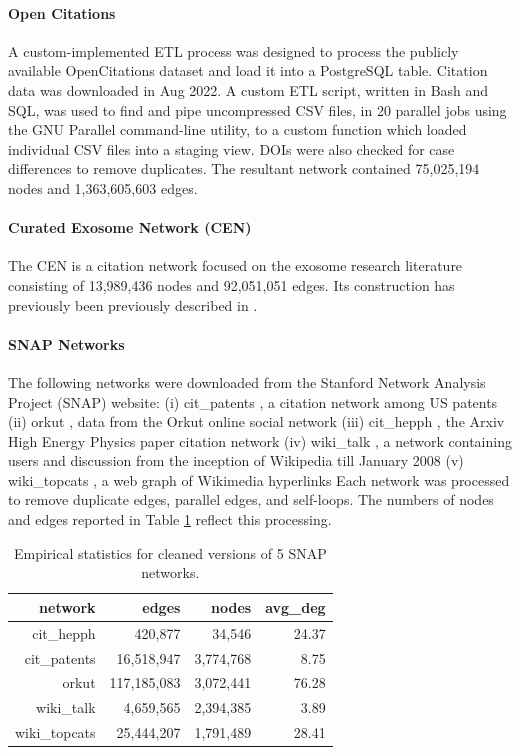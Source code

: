 \documentclass[11pt]{article}   	%
\begin{document}
\paragraph{Open Citations}
A custom-implemented ETL process was designed to process the publicly available OpenCitations dataset \citep{Peroni2020} and load it into a PostgreSQL table. Citation data was downloaded in Aug 2022. A custom ETL script, written in Bash and SQL, was used to find and pipe uncompressed CSV files, in 20 parallel jobs using the GNU Parallel command-line utility, to a custom function which loaded individual CSV files into a staging view. DOIs were also checked for case differences to remove duplicates.  The resultant network contained 75,025,194 nodes and 1,363,605,603 edges.  


\paragraph{Curated Exosome Network (CEN)}
The CEN is a citation network focused on the exosome research literature consisting of 13,989,436 nodes and 92,051,051 edges. Its construction has previously been previously described in \cite{Jakatdar_2022}.


\paragraph{SNAP Networks}The following networks were downloaded from the Stanford Network Analysis Project (SNAP) website: (i) cit\_patents \citep{Leskovec2005}, a citation network among US patents (ii) orkut \citep{Yang2013}, data from the Orkut online social network (iii) cit\_hepph \citep{Leskovec2005}, the Arxiv High Energy Physics paper citation network  (iv) wiki\_talk \citep{Leskovec2010}, a network containing users and discussion from the inception of Wikipedia till January 2008 (v) wiki\_topcats \citep{Yin2017}, a web graph of Wikimedia hyperlinks Each network was processed to remove duplicate edges, parallel edges, and self-loops.
The numbers of nodes and edges reported in Table \ref{tab:empirical-stats-SNAP} reflect this processing.

\begin{table}[ht]
\centering
\begin{tabular}{rrrr}
  \hline
 network & edges & nodes & avg\_deg \\
  \hline
  cit\_hepph & 420,877 & 34,546 & 24.37 \\
  cit\_patents & 16,518,947 & 3,774,768 & 8.75 \\
  orkut & 117,185,083 & 3,072,441 & 76.28 \\
  wiki\_talk & 4,659,565 & 2,394,385 & 3.89 \\
  wiki\_topcats & 25,444,207 & 1,791,489 & 28.41 \\
   \hline
\end{tabular}
\caption{Empirical statistics for cleaned versions of 5 SNAP networks.}
\label{tab:empirical-stats-SNAP}
\end{table}
\end{document}
